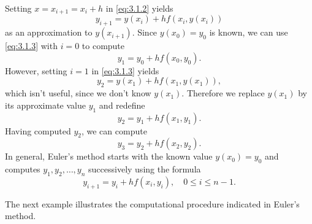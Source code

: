 \documentclass{ximera}
\begin{document}
Setting $x=x_{i+1}=x_i+h$ in \eqref{eq:3.1.2} yields
\begin{equation} \label{eq:3.1.3}
y_{i+1}=y(x_i)+hf(x_i,y(x_i))
\end{equation}
as an approximation to $y(x_{i+1})$. Since $y(x_0)=y_0$ is known, we
can use \eqref{eq:3.1.3} with $i=0$ to compute
$$
y_1=y_0+hf(x_0,y_0).
$$
However, setting $i=1$ in \eqref{eq:3.1.3} yields
$$
y_2=y(x_1)+hf(x_1,y(x_1)),
$$
which isn't  useful, since we don't know $y(x_1)$. Therefore
we replace $y(x_1)$ by its approximate value $y_1$ and redefine
$$
y_2=y_1+hf(x_1,y_1).
$$
Having computed $y_2$, we can  compute
$$
y_3=y_2+hf(x_2,y_2).
$$
In general, Euler's method starts with the known value $y(x_0)=y_0$
and computes $y_1, y_2, \ldots, y_n$ successively using the
 formula
\begin{equation} \label{eq:3.1.4}
y_{i+1}=y_i+hf(x_i,y_i),\quad 0\leq i\leq n-1.
\end{equation}
 
The next example illustrates the computational procedure
indicated in Euler's method.
 
\end{document}

